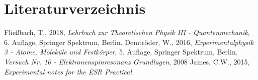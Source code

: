 \documentclass{scrartcl}
\begin{document}
\newpage
\section{Literaturverzeichnis}
\begin{thebibliography}{}
 Fließbach, T., 2018, \textit{Lehrbuch zur Theoretischen Physik III - Quantenmechanik}, 6. Auflage, Springer Spektrum, Berlin.
 Demtröder, W., 2016, \textit{Experimentalphysik 3 - Atome, Moleküle und Festkörper}, 5. Auflage, Springer Spektrum, Berlin.
 \textit{Versuch Nr. 10 - Elektronenspinresonanz Grundlagen}, 2008
 James, C.W., 2015, \textit{Experimental notes for the ESR Practical}

\end{thebibliography}

	
\end{document}
